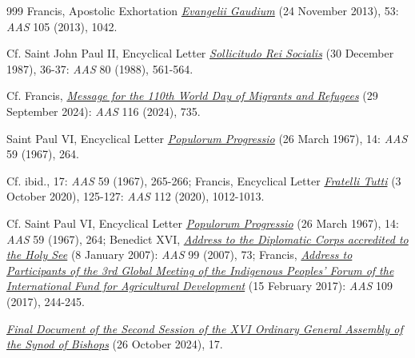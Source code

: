 \documentclass{article}
\begin{document}
\begin{thebibliography}{999}
 Francis, Apostolic Exhortation \href{https://www.vatican.va/content/francesco/en/apost_exhortations/documents/papa-francesco_esortazione-ap_20131124_evangelii-gaudium.html}{\emph{Evangelii Gaudium}} (24 November 2013), 53: \emph{AAS} 105 (2013), 1042.

 Cf. Saint John Paul II, Encyclical Letter \href{https://www.vatican.va/content/john-paul-ii/en/encyclicals/documents/hf_jp-ii_enc_30121987_sollicitudo-rei-socialis.html}{\emph{Sollicitudo Rei Socialis}} (30 December 1987), 36-37: \emph{AAS} 80 (1988), 561-564.

 Cf. Francis, \href{https://www.vatican.va/content/francesco/en/messages/migration/documents/20240524-world-migrants-day-2024.html}{\emph{Message for the 110th World Day of Migrants and Refugees}} (29 September 2024): \emph{AAS} 116 (2024), 735.

 Saint Paul VI, Encyclical Letter \href{https://www.vatican.va/content/paul-vi/en/encyclicals/documents/hf_p-vi_enc_26031967_populorum.html}{\emph{Populorum Progressio}} (26 March 1967), 14: \emph{AAS} 59 (1967), 264.

 Cf. ibid., 17: \emph{AAS} 59 (1967), 265-266; Francis, Encyclical Letter \href{https://www.vatican.va/content/francesco/en/encyclicals/documents/papa-francesco_20201003_enciclica-fratelli-tutti.html}{\emph{Fratelli Tutti}} (3 October 2020), 125-127: \emph{AAS} 112 (2020), 1012-1013.

 Cf. Saint Paul VI, Encyclical Letter \href{https://www.vatican.va/content/paul-vi/en/encyclicals/documents/hf_p-vi_enc_26031967_populorum.html}{\emph{Populorum Progressio}} (26 March 1967), 14: \emph{AAS} 59 (1967), 264; Benedict XVI, \href{https://www.vatican.va/content/benedict-xvi/en/speeches/2007/january/documents/hf_ben-xvi_spe_20070108_diplomatic-corps.html}{\emph{Address to the Diplomatic Corps accredited to the Holy See}} (8 January 2007): \emph{AAS} 99 (2007), 73; Francis, \href{https://www.vatican.va/content/francesco/en/speeches/2017/february/documents/papa-francesco_20170215_popoli-indigeni.html}{\emph{Address to Participants of the 3rd Global Meeting of the Indigenous Peoples' Forum of the International Fund for Agricultural Development}} (15 February 2017): \emph{AAS} 109 (2017), 244-245.

 \href{https://www.synod.va/content/dam/synod/news/2024-10-26_final-document/ENG---Documento-finale.pdf}{\emph{Final Document of the Second Session of the XVI Ordinary General Assembly of the Synod of Bishops}} (26 October 2024), 17.


\end{thebibliography}
\end{document}
